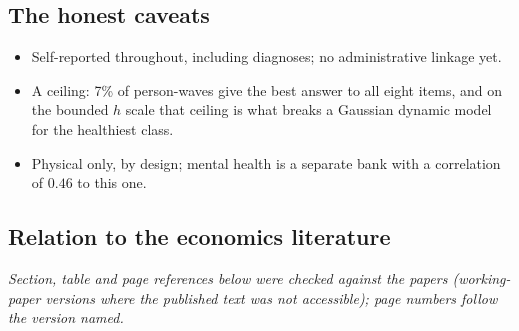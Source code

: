 \documentclass[11pt]{article}
\begin{document}
\subsection{The honest caveats}
\begin{itemize}
\item Self-reported throughout, including diagnoses; no administrative linkage yet.
\item A ceiling: 7\% of person-waves give the best answer to all eight items, and on the bounded $h$ scale that ceiling is what breaks a Gaussian dynamic model for the healthiest class.
\item Physical only, by design; mental health is a separate bank with a correlation of $0.46$ to this one.
\end{itemize}

\subsection{Relation to the economics literature}
\label{sec:lit}

\noindent\emph{Section, table and page references below were checked against the papers (working-paper versions where the published text was not accessible); page numbers follow the version named.}
\end{document}
